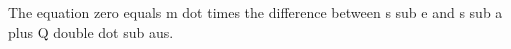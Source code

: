 The equation zero equals m dot times the difference between s sub e and s sub a plus Q double dot sub aus.